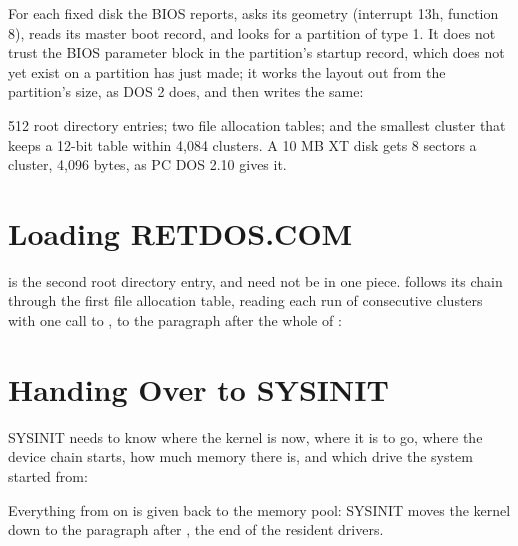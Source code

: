 For each fixed disk the BIOS reports,  asks its
geometry (interrupt 13h, function 8), reads its master boot record, and
looks for a partition of type 1. It does not trust the BIOS parameter
block in the partition's startup record, which does not yet exist on a
partition  has just made; it works the layout out from the
partition's size, as DOS 2 does, and  then writes the same:


512 root directory entries; two file allocation tables; and the smallest
cluster that keeps a 12-bit table within 4,084 clusters. A 10 MB XT disk
gets 8 sectors a cluster, 4,096 bytes, as PC DOS 2.10 gives it.

\section{Loading RETDOS.COM}

 is the second root directory entry, and need not be in
one piece.  follows its chain through the first file
allocation table, reading each run of consecutive clusters with one call
to , to the paragraph after the whole of
:


\section{Handing Over to SYSINIT}

SYSINIT needs to know where the kernel is now, where it is to go, where
the device chain starts, how much memory there is, and which drive the
system started from:


Everything from  on is given back to the memory pool:
SYSINIT moves the kernel down to the paragraph after , the
end of the resident drivers.
